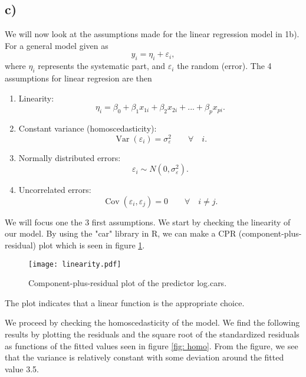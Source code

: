 \documentclass[a4paper, 10pt, reqno]{amsart}
\begin{document}
\subsection{c)}
We will now look at the assumptions made for the linear regression model in 1b). For a general model given as
\begin{equation}
    y_i = \eta_i + \varepsilon_i,
\end{equation}
where $\eta_i$ represents the systematic part, and $\varepsilon_i$ the random (error). The 4 assumptions for linear regresion are then
\begin{enumerate}
    \item Linearity:
    \begin{equation}
        \eta_i = \beta_0 + \beta_1 x_{1i} + \beta_2 x_{2i} + ... + \beta_p x_{pi}.
    \end{equation}
    \item Constant variance (homoscedasticity):
    \begin{equation}
        \operatorname{Var}\left(\varepsilon_{i}\right)=\sigma_{\varepsilon}^{2} \qquad \forall \quad  i.
    \end{equation}
    \item Normally distributed errors:
    \begin{equation}
        \varepsilon_{i} \sim N\left(0, \sigma_{\varepsilon}^{2}\right).
    \end{equation}
    \item Uncorrelated errors:
    \begin{equation}
        \operatorname{Cov}\left(\varepsilon_{i}, \varepsilon_{j}\right)=0 \qquad \forall \quad  i \neq j.
    \end{equation}
\end{enumerate}
We will focus one the 3 first assumptions. We start by checking the linearity of our model. By using the "car" library in R, we can make a CPR (component-plus-residual) plot which is seen in figure \ref{fig: linearity}.
\begin{figure}
    \centering
    \texttt{[image: linearity.pdf]}
    \caption{Component-plus-residual plot of the predictor log.cars.}
    \label{fig: linearity}
\end{figure}
The plot indicates that a linear function is the appropriate choice. 

We proceed by checking the homoscedasticity of the model. We find the following results by plotting the residuals and the square root of the standardized residuals as functions of the fitted values seen in figure \ref{fig: homo}. From the figure, we see that the variance is relatively constant with some deviation around the fitted value 3.5.
\end{document}
